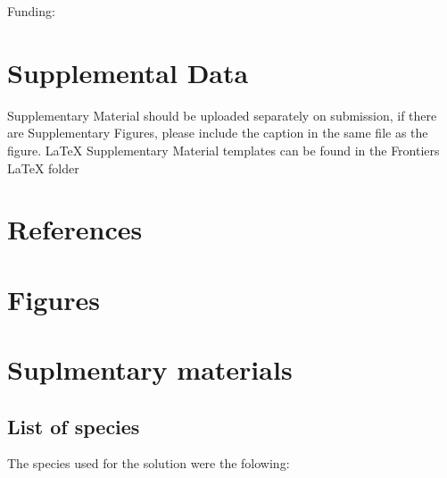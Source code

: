 \documentclass[]{article}
\begin{document}
Funding:

\hypertarget{supplemental-data}{%
\section{Supplemental Data}\label{supplemental-data}}

Supplementary Material should be uploaded separately on submission, if there are
Supplementary Figures, please include the caption in the same file as the
figure. LaTeX Supplementary Material templates can be found in the Frontiers
LaTeX folder

\hypertarget{references}{%
\section{References}\label{references}}

\hypertarget{figures}{%
\section*{Figures}\label{figures}}

\hypertarget{suplmentary-materials}{%
\section{Suplmentary materials}\label{suplmentary-materials}}

\hypertarget{list-of-species}{%
\subsection{List of species}\label{list-of-species}}

The species used for the solution were the folowing:
\end{document}
